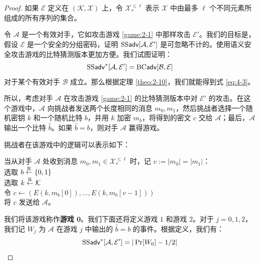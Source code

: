 \begin{proof}
如果 $\mathcal{E}$ 定义在 $(\mathcal{K},\mathcal{X})$ 上，令 $\mathcal{X}_*^{\leq\ell}$ 表示 $\mathcal{X}$ 中由最多 $\ell$ 个不同元素所组成的所有序列的集合。

令 $\mathcal{A}$ 是一个有效对手，它如攻击游戏 \ref{game:2-1} 中那样攻击 $\mathcal{E}'$。我们的目标是，假设 $\mathcal{E}$ 是一个安全的分组密码，证明 ${\rm SS\mathsf{adv}}[\mathcal{A},\mathcal{E}']$ 是可忽略不计的。使用语义安全攻击游戏的比特猜测版本更加方便。我们试图证明：
\begin{equation}\label{eq:4-4}
{\rm SS\mathsf{adv}}^*[\mathcal{A},\mathcal{E}']={\rm BC\mathsf{adv}}[\mathcal{B},\mathcal{E}]
\end{equation}
对于某个有效对手 $\mathcal{B}$ 成立。那么根据定理 \ref{theo:2-10}，我们就能得到式 \ref{eq:4-3}。

所以，考虑对手 $\mathcal{A}$ 在攻击游戏 \ref{game:2-1} 的比特猜测版本中对 $\mathcal{E}'$ 的攻击。在这个游戏中，$\mathcal{A}$ 向挑战者发送两个长度相同的消息 $m_0,m_1$，然后挑战者选择一个随机密钥 $k$ 和一个随机比特 $b$，并用 $k$ 加密 $m_b$，将得到的密文 $c$ 交给 $\mathcal{A}$；最后，$\mathcal{A}$ 输出一个比特 $\hat b$。如果 $\hat b=b$，则对手 $\mathcal{A}$ 赢得游戏。

挑战者在该游戏中的逻辑可以表示如下：

\vspace*{5pt}

\hspace*{5pt} 当从对手 $\mathcal{A}$ 处收到消息 $m_0,m_1\in\mathcal{X}_*^{\leq\ell}$ 时，记 $v:=|m_0|=|m_1|$：\\
\hspace*{50pt} 选取 $b\overset{\rm R}\leftarrow\{0,1\}$\\
\hspace*{50pt} 选取 $k\overset{\rm R}\leftarrow\mathcal{K}$\\
\hspace*{50pt} 令 $c\leftarrow(E(k,m_b[0]),\dots,E(k, m_b[v-1]))$\\
\hspace*{50pt} 将 $c$ 发送给 $\mathcal{A}$。

\vspace*{5pt}

我们将该游戏称作\textbf{游戏 $\mathbf{0}$}。我们下面还将定义游戏 $1$ 和游戏 $2$。对于 $j=0,1,2$，我们记 $W_j$ 为 $\mathcal{A}$ 在游戏 $j$ 中输出的 $\hat b=b$ 的事件。根据定义，我们有：
\begin{equation}\label{eq:4-5}
{\rm SS\mathsf{adv}}^*[\mathcal{A},\mathcal{E}']=|\Pr[W_0]-{1}/{2}|
\end{equation}


\end{proof}
